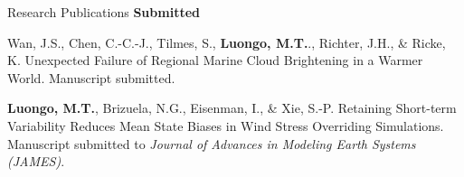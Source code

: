 \documentclass{resume} %
\begin{document}
\begin{rSection}{Research Publications}
\textbf{Submitted}
\begin{etaremune}
\item Wan, J.S., Chen, C.-C.-J., Tilmes, S., \textbf{Luongo, M.T.}., Richter, J.H., \& Ricke, K. Unexpected Failure of Regional Marine Cloud Brightening in a Warmer World. Manuscript submitted.
\item \textbf{Luongo, M.T.}, Brizuela, N.G., Eisenman, I., \& Xie, S.-P. Retaining Short-term Variability Reduces Mean State Biases in Wind Stress Overriding Simulations. Manuscript submitted to \textit{Journal of Advances in Modeling Earth Systems (JAMES)}.
\end{etaremune}

\end{rSection}
\end{document}
